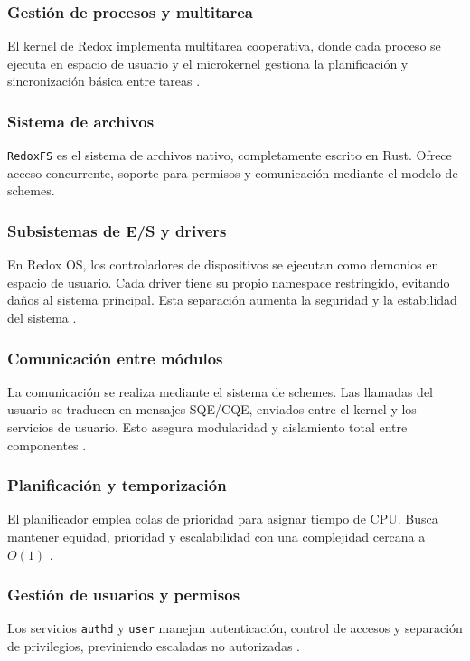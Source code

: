 \subsubsection*{Gestión de procesos y multitarea}
El kernel de Redox implementa multitarea cooperativa, donde cada proceso se ejecuta en espacio de usuario y el microkernel gestiona la planificación y sincronización básica entre tareas \citep{osdev_scheduling_algorithms}.

\subsubsection*{Sistema de archivos}
\texttt{RedoxFS} es el sistema de archivos nativo, completamente escrito en Rust. 
Ofrece acceso concurrente, soporte para permisos y comunicación mediante el modelo de schemes.

\subsubsection*{Subsistemas de E/S y drivers}
En Redox OS, los controladores de dispositivos se ejecutan como demonios en espacio de usuario. 
Cada driver tiene su propio namespace restringido, evitando daños al sistema principal. 
Esta separación aumenta la seguridad y la estabilidad del sistema \citep{redox_drivers_gitlab}.

\subsubsection*{Comunicación entre módulos}
La comunicación se realiza mediante el sistema de schemes. 
Las llamadas del usuario se traducen en mensajes SQE/CQE, enviados entre el kernel y los servicios de usuario. 
Esto asegura modularidad y aislamiento total entre componentes \citep{redox_communication}.

\subsubsection*{Planificación y temporización}
El planificador emplea colas de prioridad para asignar tiempo de CPU. 
Busca mantener equidad, prioridad y escalabilidad con una complejidad cercana a $O(1)$ \citep{osdev_scheduling_algorithms}.

\subsubsection*{Gestión de usuarios y permisos}
Los servicios \texttt{authd} y \texttt{user} manejan autenticación, control de accesos y separación de privilegios, previniendo escaladas no autorizadas \citep{redox_security}.

